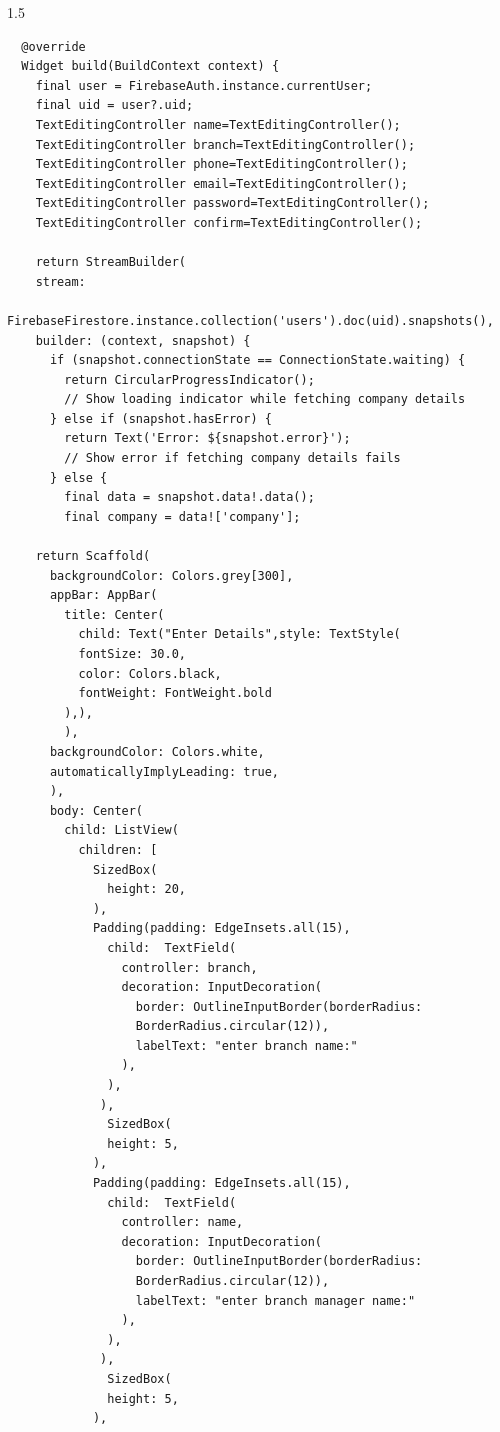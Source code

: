 \begin{spacing}{1.5}
\begin{enumerate}
\begin{verbatim}
  @override
  Widget build(BuildContext context) {
    final user = FirebaseAuth.instance.currentUser;
    final uid = user?.uid;
    TextEditingController name=TextEditingController();
    TextEditingController branch=TextEditingController();
    TextEditingController phone=TextEditingController();
    TextEditingController email=TextEditingController();
    TextEditingController password=TextEditingController();
    TextEditingController confirm=TextEditingController();

    return StreamBuilder(
    stream:
    FirebaseFirestore.instance.collection('users').doc(uid).snapshots(),
    builder: (context, snapshot) {
      if (snapshot.connectionState == ConnectionState.waiting) {
        return CircularProgressIndicator();
        // Show loading indicator while fetching company details
      } else if (snapshot.hasError) {
        return Text('Error: ${snapshot.error}'); 
        // Show error if fetching company details fails
      } else {
        final data = snapshot.data!.data();
        final company = data!['company'];

    return Scaffold(
      backgroundColor: Colors.grey[300],
      appBar: AppBar(
        title: Center(
          child: Text("Enter Details",style: TextStyle(
          fontSize: 30.0,
          color: Colors.black,
          fontWeight: FontWeight.bold
        ),),
        ),
      backgroundColor: Colors.white,
      automaticallyImplyLeading: true,
      ),
      body: Center(
        child: ListView(
          children: [
            SizedBox(
              height: 20,
            ),
            Padding(padding: EdgeInsets.all(15),
              child:  TextField(
                controller: branch,
                decoration: InputDecoration(
                  border: OutlineInputBorder(borderRadius:
                  BorderRadius.circular(12)),
                  labelText: "enter branch name:"
                ),
              ),
             ),
              SizedBox(
              height: 5,
            ),
            Padding(padding: EdgeInsets.all(15),
              child:  TextField(
                controller: name,
                decoration: InputDecoration(
                  border: OutlineInputBorder(borderRadius:
                  BorderRadius.circular(12)),
                  labelText: "enter branch manager name:"
                ),
              ),
             ),
              SizedBox(
              height: 5,
            ),
            

\end{verbatim}
\end{enumerate}
\end{spacing}

